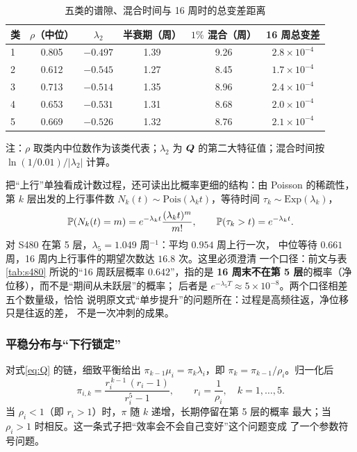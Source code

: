 \begin{table}[H]
\centering
\tabfont
\caption{五类的谱隙、混合时间与 16 周时的总变差距离}
\label{tab:spectrum}
\begin{tabular}{@{}lccccc@{}}
\toprule
类 & $\rho$（中位） & $\lambda_2$ & 半衰期（周） & $1\%$ 混合（周） & 16 周总变差 \\
\midrule
1 & 0.805 & $-0.497$ & 1.39 & 9.26 & $2.8\times10^{-4}$ \\
2 & 0.612 & $-0.545$ & 1.27 & 8.45 & $1.7\times10^{-4}$ \\
3 & 0.713 & $-0.514$ & 1.35 & 8.96 & $2.4\times10^{-4}$ \\
4 & 0.653 & $-0.531$ & 1.31 & 8.68 & $2.0\times10^{-4}$ \\
5 & 0.669 & $-0.526$ & 1.32 & 8.76 & $2.1\times10^{-4}$ \\
\bottomrule
\end{tabular}

\vspace{2pt}
\parbox{\textwidth}{\tabfont 注：$\rho$ 取类内中位数作为该类代表；$\lambda_2$
为 $\bm{Q}$ 的第二大特征值；混合时间按 $\ln(1/0.01)/|\lambda_2|$ 计算。}
\end{table}

把“上行”单独看成计数过程，还可读出比概率更细的结构：由 Poisson 的稀疏性，
第 $k$ 层出发的上行事件数 $N_k(t)\sim\text{Pois}(\lambda_k t)$，等待时间
$\tau_k\sim\text{Exp}(\lambda_k)$，
\begin{equation}
\mathbb{P}(N_k(t)=m)=e^{-\lambda_k t}\frac{(\lambda_k t)^m}{m!},
\qquad
\mathbb{P}(\tau_k>t)=e^{-\lambda_k t}.
\label{eq:pois}
\end{equation}
对 S480 在第 5 层，$\lambda_5=1.049$ 周$^{-1}$：平均 $0.954$ 周上行一次，
中位等待 $0.661$ 周，16 周内上行事件的期望次数达 $16.8$ 次。这里必须澄清
一个口径：前文与表 \ref{tab:s480} 所说的“16 周跃层概率 $0.642$”，指的是
\textbf{16 周末不在第 5 层}的概率（净位移），而不是“期间从未跃层”的概率；
后者是 $e^{-\lambda_5 T}\approx5\times10^{-8}$。两个口径相差五个数量级，恰恰
说明原文式“单步提升”的问题所在：过程是高频往返，净位移只是往返的差，
不是一次冲刺的成果。

\subsubsection{平稳分布与“下行锁定”}

对式\eqref{eq:Q} 的链，细致平衡给出 $\pi_{k-1}\mu_i=\pi_k\lambda_i$，即
$\pi_k=\pi_{k-1}/\rho_i$。归一化后
\begin{equation}
\pi_{i,k}=\frac{r_i^{\,k-1}\,(r_i-1)}{r_i^{5}-1},\qquad r_i=\frac{1}{\rho_i},
\quad k=1,\dots,5 .
\label{eq:pi}
\end{equation}
当 $\rho_i<1$（即 $r_i>1$）时，$\pi$ 随 $k$ 递增，长期停留在第 5 层的概率
最大；当 $\rho_i>1$ 时相反。这一条式子把“效率会不会自己变好”这个问题变成
了一个参数符号问题。

